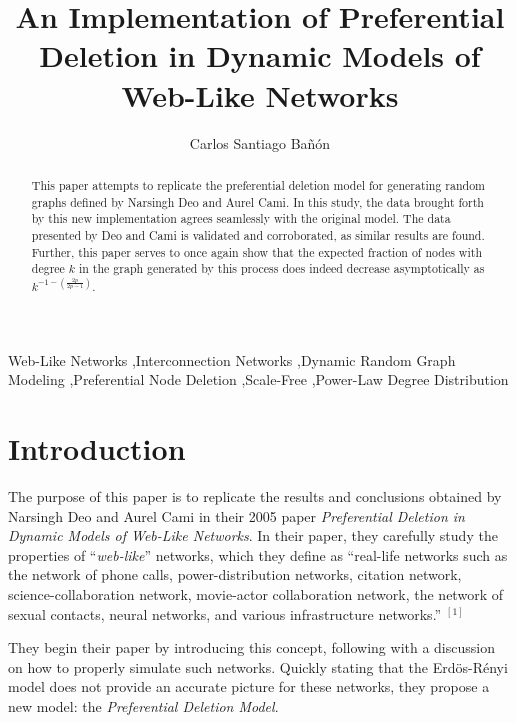 \documentclass[final,3p,times,twocolumn]{elsarticle}
\begin{document}
\begin{frontmatter}

\title{An Implementation of Preferential Deletion in Dynamic Models of Web-Like Networks}
\author{Carlos Santiago Bañón}
\address{College of Engineering and Computer Science - University of Central Florida - Orlando, FL}

\begin{abstract}
This paper attempts to replicate the preferential deletion model for generating random graphs defined by Narsingh Deo and Aurel Cami. In this study, the data brought forth by this new implementation agrees seamlessly with the original model. The data presented by Deo and Cami is validated and corroborated, as similar results are found. Further, this paper serves to once again show that the expected fraction of nodes with degree $k$ in the graph generated by this process does indeed decrease asymptotically as $k^{-1 - (\frac{2p}{2p - 1})}$.
\end{abstract}

\begin{keyword}
Web-Like Networks \sep Interconnection Networks \sep Dynamic Random Graph Modeling \sep Preferential Node Deletion \sep Scale-Free \sep Power-Law Degree Distribution
\end{keyword}

\end{frontmatter}

\section{Introduction}
\label{S:1}

The purpose of this paper is to replicate the results and conclusions obtained by Narsingh Deo and Aurel Cami in their 2005 paper \textit{Preferential Deletion in Dynamic Models of Web-Like Networks}. In their paper, they carefully study the properties of “\textit{web-like}” networks, which they define as “real-life networks such as the network of phone calls, power-distribution networks, citation network, science-collaboration network, movie-actor collaboration network, the network of sexual contacts, neural networks, and various infrastructure networks.” $^{[1]}$

They begin their paper by introducing this concept, following with a discussion on how to properly simulate such networks. Quickly stating that the Erdös-Rényi model does not provide an accurate picture for these networks, they propose a new model: the \textit{Preferential Deletion Model}.
\end{document}
